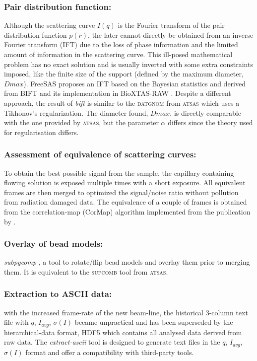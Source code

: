 \documentclass[preprint]{iucr}              %
\begin{document}
\subsubsection{Pair distribution function:}
Although the scattering curve $I(q)$ is the Fourier transform of the pair distribution function $p(r)$, the later cannot directly be obtained from an inverse Fourier transform (IFT) due to the loss of phase information and the limited amount of information in the scattering curve. 
This ill-posed mathematical problem has no exact solution and is usually inverted with some extra constraints imposed, like the finite size of the support (defined by the maximum diameter, $Dmax$).    
FreeSAS proposes an IFT based on the Bayesian statistics and derived from BIFT \cite{bift} and its implementation in BioXTAS-RAW \cite{bioxtasraw}.
Despite a different approach, the result of \textit{bift} is similar to the \textsc{datgnom} \cite{ATSAS1} from \textsc{atsas} which uses a Tikhonov's regularization.
The diameter found, $Dmax$, is directly comparable with the one provided by \textsc{atsas}, but the parameter $\alpha$ differs since the theory used for regularisation differs. 

\subsubsection{Assessment of equivalence of scattering curves: }
To obtain the best possible signal from the sample, the capillary containing flowing solution is exposed multiple times with a short exposure.
All equivalent frames are then merged to optimized the signal/noise ratio without pollution from radiation damaged data.  
The equivalence of a couple of frames is obtained from the correlation-map (CorMap) algorithm implemented from the publication by .

\subsubsection{Overlay of bead models:}
\textit{subpycomp} \cite{BM29ODA}, a tool to rotate/flip bead models and overlay them prior to merging them. It is equivalent to the \textsc{supcomb} \cite{supcomb} tool from \textsc{atsas}. 

\subsubsection{Extraction to ASCII data:} with the increased frame-rate of the new beam-line, the historical 3-column text file with $q$, $I_{avg}$, $\sigma(I)$ became unpractical and has been superseded by the hierarchical-data format, HDF5 \cite{hdf5} which contains all analysed data derived from raw data.
The \textit{extract-ascii} tool is designed to generate text files in the  $q$, $I_{avg}$, $\sigma(I)$ format and offer a compatibility with third-party tools.
\end{document}
